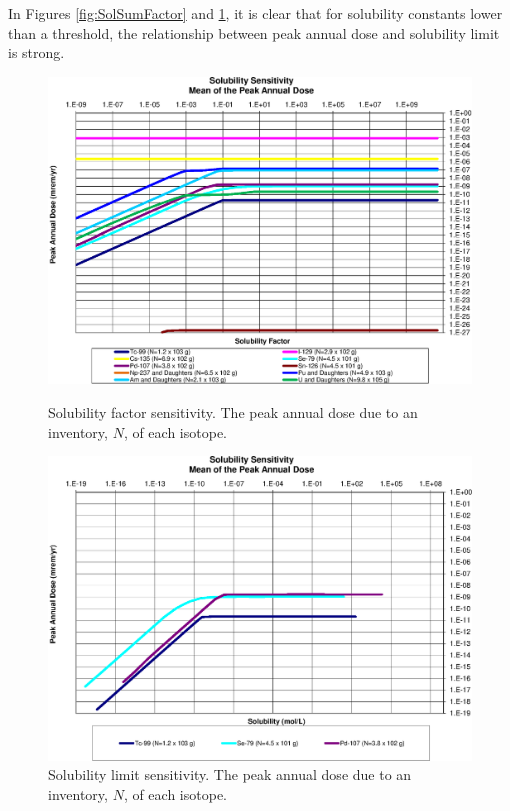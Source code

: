 In Figures \ref{fig:SolSumFactor} and \ref{fig:SolSum}, it is clear that for 
solubility constants lower than a threshold, the relationship between peak 
annual dose and solubility limit is strong.

\begin{figure}[ht]
\centering
\includegraphics[width=0.7\linewidth]{./chapters/nuclide_sensitivity/clay/Solubility/Solubility_Summary_SolFactor.eps}
\caption{Solubility factor sensitivity. The peak annual dose due to an inventory, 
$N$, of each isotope.}
\label{fig:SolSumFactor}

\includegraphics[width=0.7\linewidth]{./chapters/nuclide_sensitivity/clay/Solubility/Solubility_Summary_Sol.eps}
\caption{Solubility limit sensitivity. The peak annual dose due to an inventory, 
$N$, of each isotope.}
\label{fig:SolSum}
\end{figure}
\clearpage

